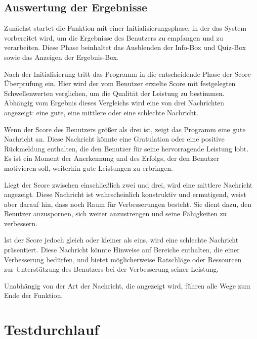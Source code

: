 \documentclass[10pt, fleqn]{scrartcl}
\begin{document}
\subsection{Auswertung der Ergebnisse}

Zunächst startet die Funktion mit einer Initialisierungsphase, in der das System vorbereitet wird, um die Ergebnisse des Benutzers zu empfangen und zu verarbeiten. Diese Phase beinhaltet das Ausblenden der Info-Box und Quiz-Box sowie das Anzeigen der Ergebnis-Box.

Nach der Initialisierung tritt das Programm in die entscheidende Phase der Score-Überprüfung ein. Hier wird der vom Benutzer erzielte Score mit festgelegten Schwellenwerten verglichen, um die Qualität der Leistung zu bestimmen. Abhängig vom Ergebnis dieses Vergleichs wird eine von drei Nachrichten angezeigt: eine gute, eine mittlere oder eine schlechte Nachricht.

Wenn der Score des Benutzers größer als drei ist, zeigt das Programm eine gute Nachricht an. Diese Nachricht könnte eine Gratulation oder eine positive Rückmeldung enthalten, die den Benutzer für seine hervorragende Leistung lobt. Es ist ein Moment der Anerkennung und des Erfolgs, der den Benutzer motivieren soll, weiterhin gute Leistungen zu erbringen.

Liegt der Score zwischen einschließlich zwei und drei, wird eine mittlere Nachricht angezeigt. Diese Nachricht ist wahrscheinlich konstruktiv und ermutigend, weist aber darauf hin, dass noch Raum für Verbesserungen besteht. Sie dient dazu, den Benutzer anzuspornen, sich weiter anzustrengen und seine Fähigkeiten zu verbessern.

Ist der Score jedoch gleich oder kleiner als eins, wird eine schlechte Nachricht präsentiert. Diese Nachricht könnte Hinweise auf Bereiche enthalten, die einer Verbesserung bedürfen, und bietet möglicherweise Ratschläge oder Ressourcen zur Unterstützung des Benutzers bei der Verbesserung seiner Leistung.

Unabhängig von der Art der Nachricht, die angezeigt wird, führen alle Wege zum Ende der Funktion.


\newpage

\section{Testdurchlauf}
\end{document}
